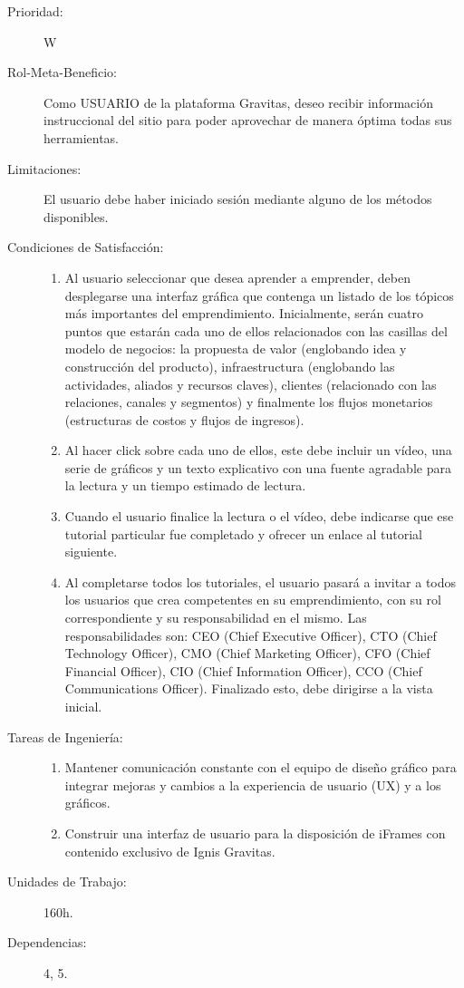 \begin{description}
    \item[Prioridad:] W
    \item[Rol-Meta-Beneficio:]  Como USUARIO de la plataforma Gravitas, deseo recibir información instruccional del sitio para poder aprovechar de manera óptima todas sus herramientas.
    \item[Limitaciones:]  El usuario debe haber iniciado sesión mediante alguno de los métodos disponibles.
    \item[Condiciones de Satisfacción:] \hfill
        \begin{enumerate}
            \item Al usuario seleccionar que desea aprender a emprender, deben desplegarse una interfaz gráfica que contenga un listado de los tópicos más importantes del emprendimiento.  Inicialmente, serán cuatro puntos que estarán cada uno de ellos relacionados con las casillas del modelo de negocios: la propuesta de valor (englobando idea y construcción del producto), infraestructura (englobando las actividades, aliados y recursos claves), clientes (relacionado con las relaciones, canales y segmentos) y finalmente los flujos monetarios (estructuras de costos y flujos de ingresos).
            \item Al hacer click sobre cada uno de ellos, este debe incluir un vídeo, una serie de gráficos y un texto explicativo con una fuente agradable para la lectura y un tiempo estimado de lectura.
            \item Cuando el usuario finalice la lectura o el vídeo, debe indicarse que ese tutorial particular fue completado y ofrecer un enlace al tutorial siguiente.
            \item Al completarse todos los tutoriales, el usuario pasará a invitar a todos los usuarios que crea competentes en su emprendimiento, con su rol correspondiente y su responsabilidad en el mismo. Las responsabilidades son: CEO (Chief Executive Officer), CTO (Chief Technology Officer), CMO (Chief Marketing Officer), CFO (Chief Financial Officer), CIO (Chief Information Officer), CCO (Chief Communications Officer). Finalizado esto, debe dirigirse a la vista inicial.
        \end{enumerate}
    \item[Tareas de Ingeniería:] \hfill
        \begin{enumerate}
            \item Mantener comunicación constante con el equipo de diseño gráfico para integrar mejoras y cambios a la experiencia de usuario (UX) y a los gráficos.
            \item Construir una interfaz de usuario para la disposición de iFrames  con contenido exclusivo de Ignis Gravitas.
        \end{enumerate}
    \item[Unidades de Trabajo:] 160h.
    \item[Dependencias:] 4, 5.
\end{description}


